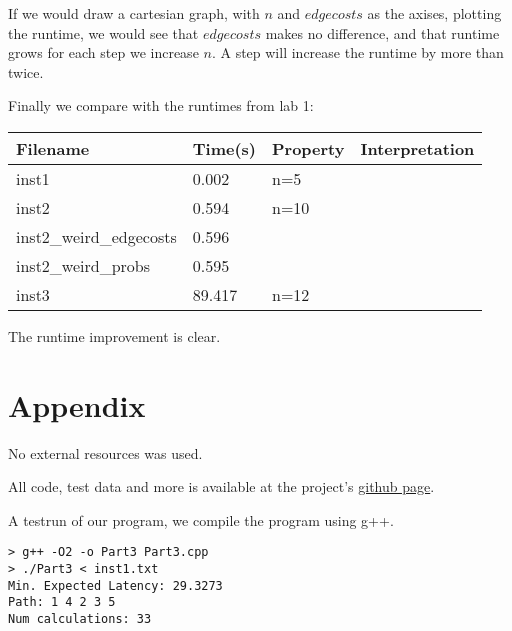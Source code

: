 \documentclass[a4paper,11pt]{article}
\begin{document}
If we would draw a cartesian graph, with $n$ and $edgecosts$ as the axises, plotting the runtime,
we would see that $edgecosts$ makes no difference, and that runtime grows for each
step we increase $n$. A step will increase the runtime by more than twice.

Finally we compare with the runtimes from lab 1:


\begin{center}
    \begin{tabular}{ | l | l | p{4cm} | p{5cm} |}
    \hline
    Filename & Time(s) & Property & Interpretation \\ \hline
    inst1 & 0.002 & n=5 \\ \hline
    inst2 & 0.594 & n=10 \\ \hline
    inst2\_weird\_edgecosts & 0.596 \\ \hline
    inst2\_weird\_probs & 0.595 & \\ \hline
    inst3 & 89.417 & n=12 \\ \hline
    \end{tabular}
\end{center}

The runtime improvement is clear.

\section{Appendix}
No external resources was used.

All code, test data and more is available at the project's \href{https://github.com/bisforboman/Algorithms-TIN092}{github page}.

A testrun of our program, we compile the program using g++.

\begin{lstlisting}
> g++ -O2 -o Part3 Part3.cpp
> ./Part3 < inst1.txt
Min. Expected Latency: 29.3273
Path: 1 4 2 3 5
Num calculations: 33

\end{lstlisting}
\end{document}
